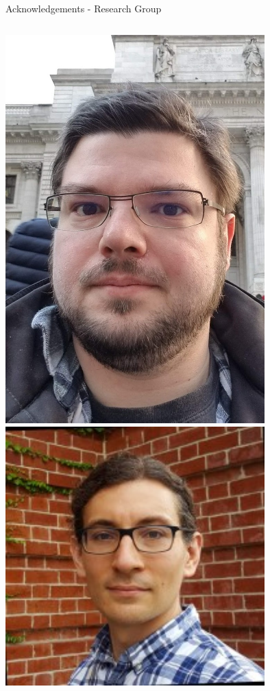 \documentclass[aspectratio=169]{beamer}
\begin{document}
\begin{frame}{Acknowledgements - Research Group}
\begin{columns}
            \includegraphics[width=0.75\textwidth]{people/actual_mrg/jan.png}
            \includegraphics[width=0.75\textwidth]{people/actual_mrg/ross.png}
            

\end{columns}
\end{frame}
\end{document}
